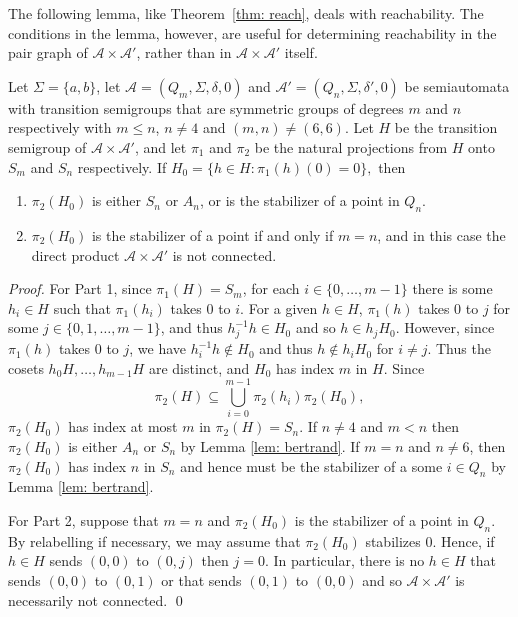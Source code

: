 \documentclass{llncs}
\newcommand{\Sig}{\Sigma}
\newcommand{\be}{\begin{enumerate}}
\newcommand{\ee}{\end{enumerate}}
\newcommand{\cA}{{\mathcal A}}
\begin{document}
The following lemma, like Theorem~\ref{thm: reach}, deals with reachability. The conditions in the lemma, however, are useful for determining reachability in the pair graph of $\cA\times\cA'$, rather than in  $\cA\times\cA'$ itself.
\begin{lemma}
Let  $\Sig=\{a,b\}$, let $\cA=(Q_m,\Sig, \delta,0)$ and $\cA'=(Q_n,\Sig, \delta',0)$ be 
semiautomata with transition semigroups  that are  symmetric groups  of degrees $m$ and $n$ respectively with $m\le n$, $n\neq 4$ and $(m,n)\neq (6,6)$.  
Let $H$ be the transition semigroup of $\cA\times \cA'$, and let $\pi_1$ and $\pi_2$ be the natural projections from $H$ onto $S_m$ and $S_n$ respectively. If
$H_0=\{h\in H\colon\pi_1(h)(0)=0\},$ 
then 
\be
\item $\pi_2(H_0)$ is either $S_n$ or $A_n$, or is the stabilizer of a point in $Q_n$. 
\item
$\pi_2(H_0)$ is the stabilizer of a point if and only if $m=n$, and in this case the direct product $\cA\times \cA'$ is not connected.
\ee
\label{lem: H0}
\end{lemma}
\begin{proof}
For Part 1, 
since $\pi_1(H)=S_m$, for each $i\in \{0,\dots ,m-1\}$ there is some $h_i\in H$ such that $\pi_1(h_i)$ takes $0$ to $i$.  For a given $h\in H$, $\pi_1(h)$ takes $0$ to $j$ for some $j\in \{0,1,\dots ,m-1\}$, and thus $h_j^{-1}h\in H_0$ and so $h\in h_j H_0$.  However, since $\pi_1(h)$ takes $0$ to $j$, we have $h_i^{-1}h \not\in H_0$ and thus $h \not\in h_iH_0$ for $i \ne j$. Thus the cosets $h_0H,\ldots ,h_{m-1}H$ are distinct, and  $H_0$ has index $m$ in $H$.  Since 
$$\pi_2(H)\subseteq \bigcup_{i=0}^{m-1} \pi_2(h_i)\pi_2(H_0),$$ 
$\pi_2(H_0)$ has index at most $m$ in $\pi_2(H)=S_n$.   If $n\neq 4$ and $m<n$ then $\pi_2(H_0)$ is either $A_n$ or $S_n$ by Lemma \ref{lem: bertrand}. 
If $m=n$ and $n\neq 6$, then $\pi_2(H_0)$ has index $n$ in $S_n$ and hence must be the stabilizer of a some $i\in Q_n$ by Lemma \ref{lem: bertrand}.  

For Part 2, suppose that $m=n$ and $\pi_2(H_0)$ is the stabilizer of a point in $Q_n$.
By relabelling if necessary, we may assume that $\pi_2(H_0)$ stabilizes $0$.  Hence, if $h\in H$ sends $(0,0)$ to $(0,j)$ then $j=0$.  In particular, there is no $h\in H$ that sends $(0,0)$ to $(0,1)$ or that sends $(0,1)$ to $(0,0)$ and so $\cA\times \cA'$ is necessarily not connected.
\qed
\end{proof}
\end{document}
